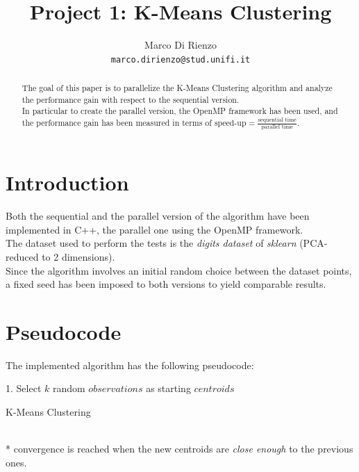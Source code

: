 \documentclass[10pt,twocolumn,letterpaper]{article}
\begin{document}
\title{Project 1: K-Means Clustering}

\author{Marco Di Rienzo\\
{\tt\small marco.dirienzo@stud.unifi.it}
}

\maketitle
\thispagestyle{empty}

\begin{abstract}
	The goal of this paper is to parallelize the K-Means Clustering algorithm and analyze the performance gain with respect to the sequential version.\\
	In particular to create the parallel version, the OpenMP framework has been used, and the performance gain has been measured in terms of $\text{speed-up}=\frac{\text{sequential time}}{\text{parallel time}}$.
\end{abstract}

\section{Introduction}
Both the sequential and the parallel version of the algorithm have been implemented in C++, the parallel one using the OpenMP framework.\\
The dataset used to perform the tests is the \textit{digits dataset} of \textit{sklearn} (PCA-reduced to 2 dimensions).\\
Since the algorithm involves an initial random choice between the dataset points, a fixed seed has been imposed to both versions to yield comparable results.

\section{Pseudocode}
The implemented algorithm has the following pseudocode:
\begin{algorithm}
	\SetAlgoLined
	1. Select $k$ random $observations$ as starting $centroids$\;
	\caption{K-Means Clustering}
	\label{pseudocode}
\end{algorithm}\\
* convergence is reached when the new centroids are \textit{close enough} to the previous ones.
\end{document}

